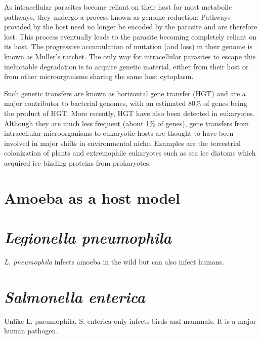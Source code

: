 As intracellular parasites become reliant on their host for most metabolic pathways, they undergo a process known as genome reduction: Pathways provided by the host need no longer be encoded by the parasite and are therefore lost. This process eventually leads to the parasite becoming completely reliant on its host. The progressive accumulation of mutation (and loss) in their genome is known as Muller's ratchet. The only way for intracellular parasites to escape this ineluctable degradation is to acquire genetic material, either from their host or from other microorganisms sharing the same host cytoplasm.

Such genetic transfers are known as horizontal gene transfer (HGT) and are a major contributor to bacterial genomes, with an estimated 80\% of genes being the product of HGT. More recently, HGT have also been detected in eukaryotes. Although they are much less frequent (about 1\% of genes), gene transfers from intracellular microorganisms to eukaryotic hosts are thought to have been involved in major shifts in environmental niche. Examples are the terrestrial colonization of plants and extremophile eukaryotes such as sea ice diatoms which acquired ice binding proteins from prokaryotes.

\section{Amoeba as a host model}

\section{\textit{Legionella pneumophila}}

\textit{L. pneumophila} infects amoeba in the wild but can also infect humans.

\section{\textit{Salmonella enterica}}

Unlike {L. pneumophila}, {S. enterica} only infects birds and mammals. It is a major human pathogen.